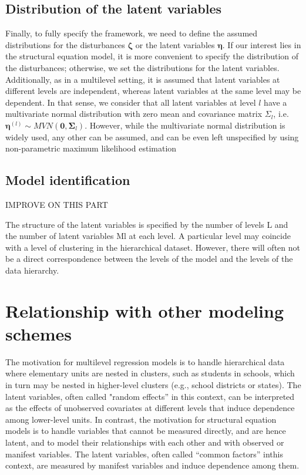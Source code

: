 \subsection{Distribution of the latent variables}
Finally, to fully specify the framework, we need to define the assumed distributions for the disturbances $\pmb{\zeta}$ or the latent variables $\pmb{\eta}$. If our interest lies in the structural equation model, it is more convenient to specify the distribution of the disturbances; otherwise, we set the distributions for the latent variables. Additionally, as in a multilevel setting, it is assumed that latent variables at different levels are independent, whereas latent variables at the same level may be dependent. In that sense, we consider that all latent variables at level $l$ have a multivariate normal distribution with zero mean and covariance matrix $\Sigma_{l}$, i.e. $\pmb{\eta}^{(l)} \sim MVN(\mathbf{0}, \pmb{\Sigma}_{l})$. However, while the multivariate normal distribution is widely used, any other can be assumed, and can be even left unspecified by using non-parametric maximum likelihood estimation \citep{Rabe_et_al_2003a}



\subsection{Model identification}
{\color{red} IMPROVE ON THIS PART
	
	The structure of the latent variables is specified by the number of levels L and the number
	of latent variables Ml at each level. A particular level may coincide with a level of clustering in the hierarchical dataset. However, there will often not be a direct correspondence between the levels of the model and the levels of the data hierarchy.
}


\section{Relationship with other modeling schemes}

\citet{Rabe_et_al_2012}

{\color{red} The motivation for multilevel regression models is to handle hierarchical data where elementary units are nested in clusters, such as students in schools, which in
turn may be nested in higher-level clusters (e.g., school districts or states). The latent variables, often called "random effects” in this context, can be interpreted as
the effects of unobserved covariates at different levels that induce dependence among lower-level units. In contrast, the motivation for structural equation models is to
handle variables that cannot be measured directly, and are hence latent, and to model their relationships with each other and with observed or manifest variables.
The latent variables, often called “common factors” inthis context, are measured by manifest variables and induce dependence among them.}


